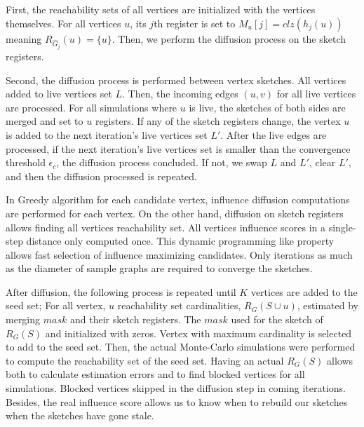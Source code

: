 \documentclass[10pt,journal,compsoc]{IEEEtran}
\begin{document}
First, the reachability sets of all vertices are initialized with the vertices themselves. For all vertices $u$, its $j$th register is set to $M_u[j]=clz(h_j(u))$ meaning $R_{\hat{G}_j}(u) = \{u\}$. Then, we perform the diffusion process on the sketch registers. 

Second, the diffusion process is performed between vertex sketches. All vertices added to live vertices set $L$. Then, the incoming edges $(u,v)$ for all live vertices are processed. For all simulations where $u$ is live, the sketches of both sides are merged and set to $u$ registers. If any of the sketch registers change, the vertex $u$ is added to the next iteration's live vertices set $L'$. After the live edges are processed, if the next iteration's live vertices set is smaller than the convergence threshold $\epsilon_c$, the diffusion process concluded. If not, we swap $L$ and $L'$, clear $L'$, and then the diffusion processed is repeated. 

In Greedy algorithm\cite{kempe2003maximizing} for each candidate vertex, influence diffusion computations are performed for each vertex.  On the other hand, diffusion on sketch registers allows finding all vertices reachability set. All vertices influence scores in a single-step distance only computed once. This dynamic programming like property allows fast selection of influence maximizing candidates. Only iterations as much as the diameter of sample graphs are required to converge the sketches. 


After diffusion, the following process is repeated until $K$ vertices are added to the seed set; For all vertex, $u$ reachability set cardinalities, $R_G(S\cup u)$, estimated by merging $mask$ and their sketch registers. The $mask$ used for the sketch of $R_G(S)$ and initialized with zeros. Vertex with maximum cardinality is selected to add to the seed set. Then, the actual Monte-Carlo simulations were performed to compute the reachability set of the seed set. Having an actual $R_G(S)$ allows both to calculate estimation errors and to find blocked vertices for all simulations. Blocked vertices skipped in the diffusion step in coming iterations. Besides, the real influence score allows us to know when to rebuild our sketches when the sketches have gone stale.
\end{document}

